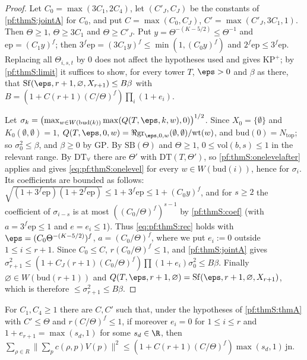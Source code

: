 \begin{proof}
Let $C_0=\max(3C_1,2C_4)$, let $(C'_J,C_J)$ be the constants of \cref{pf:thmS:jointA} for $C_0$, and put
$C=\max(C_0,C_J)$, $C'=\max(C'_J,3C_1,1)$. Then $\Theta\ge1$, $\Theta\ge3C_1$ and $\Theta\ge C'_J$. Put
$y=\Theta^{-(K-5/2)}\le\Theta^{-1}$ and $\mathrm{ep}=(C_1y)^f$; then $3^f\mathrm{ep}=(3C_1y)^f\le\min(1,(C_0y)^f)$ and
$2^f\mathrm{ep}\le3^f\mathrm{ep}$. Replacing all $\Theta_{i,s,t}$ by $0$ does not affect the hypotheses used and gives
$\mathrm{KP}^{+}$; by \cref{pf:thmS:limit} it suffices to show, for every tower $T$, $\eps>0$ and $\beta$ as there,
that $\thmSSf(\eps,r+1,\varnothing,X_{r+1})\le B\beta$ with $B=(1+C(r+1)(C/\Theta)^f)\prod_i(1+e_i)$.

Let $\sigma_k=\bigl(\max_{w\in W(\mathrm{bud}(k))}\max(Q(T,\eps,k,w),0)\bigr)^{1/2}$. Since $X_0=\{\emptyset\}$ and
$K_0(\emptyset,\emptyset)=1$, $Q(T,\eps,0,w)=\Re\thmSgram_{\eps,0,w}(\emptyset,\emptyset)/\mathrm{wt}(w)$, and
$\mathrm{bud}(0)=N_{\mathrm{top}}$; so $\sigma_0^2\le\beta$, and $\beta\ge0$ by $\mathrm{GP}$. By
$\mathrm{SB}(\Theta)$ and $\Theta\ge1$, $0\le\mathrm{vol}(b,s)\le1$ in the relevant range. By $\mathrm{DT}_{\forall}$
there are $\Theta'$ with $\mathrm{DT}(T,\Theta')$, so \cref{pf:thmS:onelevelafter} applies and gives
\eqref{eq:pf:thmS:onelevel} for every $w\in W(\mathrm{bud}(i))$, hence for $\sigma_i$. Its coefficients are bounded as
follows: $\sqrt{(1+3^f\mathrm{ep})(1+2^f\mathrm{ep})}\le1+3^f\mathrm{ep}\le1+(C_0y)^f$, and for $s\ge2$ the
coefficient of $\sigma_{i-s}$ is at most $((C_0/\Theta)^f)^{s-1}$ by \cref{pf:thmS:coef} (with $a=3^f\mathrm{ep}\le1$ and
$e=e_i\le1$). Thus \eqref{eq:pf:thmS:rec} holds with
$\eps=(C_0\Theta^{-(K-5/2)})^f$, $a=(C_0/\Theta)^f$, where we put $e_i:=0$ outside $1\le i\le r+1$. Since $C_0\le C$,
$r(C_0/\Theta)^f\le1$, and \cref{pf:thmS:jointA} gives
$\sigma_{r+1}^2\le(1+C_J(r+1)(C_0/\Theta)^f)\prod(1+e_i)\sigma_0^2\le B\beta$. Finally $\varnothing\in W(\mathrm{bud}(r+1))$
and $Q(T,\eps,r+1,\varnothing)=\thmSSf(\eps,r+1,\varnothing,X_{r+1})$, which is therefore $\le\sigma_{r+1}^2\le B\beta$.
\end{proof}

\begin{corollary}\label{pf:thmS:recdens}
For $C_1,C_4\ge1$ there are $C,C'$ such that, under the hypotheses of \cref{pf:thmS:thmA} with $C'\le\Theta$ and
$r(C/\Theta)^f\le1$, if moreover $e_i=0$ for $1\le i\le r$ and $1+e_{r+1}=\max(s_d,1)$ for some $s_d\in\R$, then
$\sum_{\rho\in R}\|\sum_pc(\rho,p)V(p)\|^2\le(1+C(r+1)(C/\Theta)^f)\max(s_d,1)\,\mathrm{jn}$.
\end{corollary}

